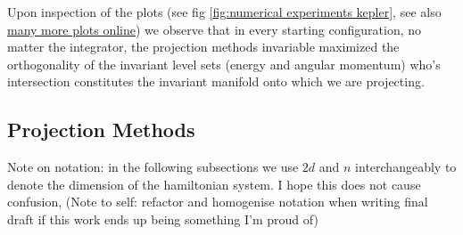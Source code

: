 \documentclass[12pt]{article}
\begin{document}
Upon inspection of the plots (see fig \ref{fig:numerical experiments kepler}, see also \href{https://github.com/dcxSt/numerical_integrators/tree/master/figures/gallary}{many more plots online}) we observe that in every starting configuration, no matter the integrator, the projection methods invariable maximized the orthogonality of the invariant level sets (energy and angular momentum) who's intersection constitutes the invariant manifold onto which we are projecting.  



\subsection{Projection Methods}

Note on notation: in the following subsections we use $2d$ and $n$ interchangeably to denote the dimension of the hamiltonian system. I hope this does not cause confusion, (Note to self: refactor and homogenise notation when writing final draft if this work ends up being something I'm proud of) 
\end{document}
